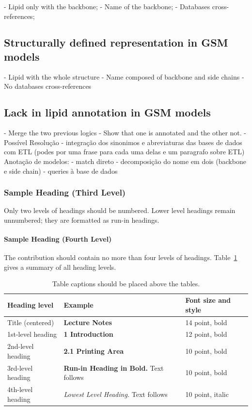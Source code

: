 \documentclass{llncs}
\begin{document}
- Lipid only with the backbone; 
- Name of the backbone;
- Databases cross-references;

\subsection{Structurally defined representation in GSM models}

- Lipid with the whole structure
- Name composed of backbone and side chains
- No databases cross-references

\subsection{Lack in lipid annotation in GSM models}

- Merge the two previous logics
- Show that one is annotated and the other not.
- Possível Resolução
    - integração dos sinonimos e abreviaturas das bases de dados com ETL (podes por uma frase para cada uma delas e um paragrafo sobre ETL)
    Anotação de modelos:
        - match direto
        - decomposição do nome em dois (backbone e side chain) - queries à base de dados

\subsubsection{Sample Heading (Third Level)} Only two levels of
headings should be numbered. Lower level headings remain unnumbered;
they are formatted as run-in headings.

\paragraph{Sample Heading (Fourth Level)}
The contribution should contain no more than four levels of
headings. Table~\ref{tab1} gives a summary of all heading levels.

\begin{table}
\caption{Table captions should be placed above the
tables.}\label{tab1}
\begin{tabular}{|l|l|l|}
\hline
Heading level &  Example & Font size and style\\
\hline
Title (centered) &  {\Large\bfseries Lecture Notes} & 14 point, bold\\
1st-level heading &  {\large\bfseries 1 Introduction} & 12 point, bold\\
2nd-level heading & {\bfseries 2.1 Printing Area} & 10 point, bold\\
3rd-level heading & {\bfseries Run-in Heading in Bold.} Text follows & 10 point, bold\\
4th-level heading & {\itshape Lowest Level Heading.} Text follows & 10 point, italic\\
\hline
\end{tabular}
\end{table}
\end{document}
